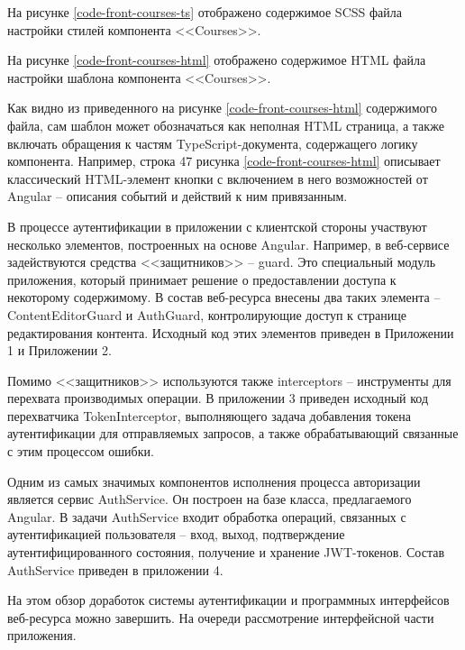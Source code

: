 На рисунке \ref{code-front-courses-ts} отображено содержимое SCSS файла настройки стилей компонента <<Courses>>.


На рисунке \ref{code-front-courses-html} отображено содержимое HTML файла настройки шаблона компонента <<Courses>>.


Как видно из приведенного на рисунке \ref{code-front-courses-html} содержимого файла, сам шаблон может обозначаться как неполная HTML страница, а также включать обращения к частям TypeScript-документа, содержащего логику компонента.
Например, строка 47 рисунка \ref{code-front-courses-html} описывает классический HTML-элемент кнопки с включением в него возможностей от Angular -- описания событий и действий к ним привязанным.

В процессе аутентификации в приложении с клиентской стороны участвуют несколько элементов, построенных на основе Angular.
Например, в веб-сервисе задействуются средства <<защитников>> -- guard.
Это специальный модуль приложения, который принимает решение о предоставлении доступа к некоторому содержимому.
В состав веб-ресурса внесены два таких элемента -- ContentEditorGuard и AuthGuard, контролирующие доступ к странице редактирования контента.
Исходный код этих элементов приведен в Приложении 1 и Приложении 2.

Помимо <<защитников>> используются также interceptors -- инструменты для перехвата производимых операции.
В приложении 3 приведен исходный код перехватчика TokenInterceptor, выполняющего задача добавления токена аутентификации для отправляемых запросов, а также обрабатывающий связанные с этим процессом ошибки.

Одним из самых значимых компонентов исполнения процесса авторизации является сервис AuthService.
Он построен на базе класса, предлагаемого Angular.
В задачи AuthService входит обработка операций, связанных с аутентификацией пользователя -- вход, выход, подтверждение аутентифицированного состояния, получение и хранение JWT-токенов.
Состав AuthService приведен в приложении 4.

На этом обзор доработок системы аутентификации и программных интерфейсов веб-ресурса можно завершить.
На очереди рассмотрение интерфейсной части приложения.
\clearpage
